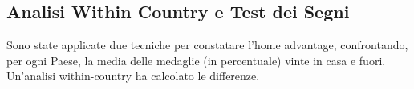 \subsection{Analisi Within Country e Test dei Segni}\label{sec:methods_within_country}











Sono state applicate due tecniche per constatare l'home advantage, confrontando,
per ogni Paese, la media delle medaglie (in percentuale) vinte in casa e
fuori.\\
Un'analisi within-country ha calcolato le differenze.\\



